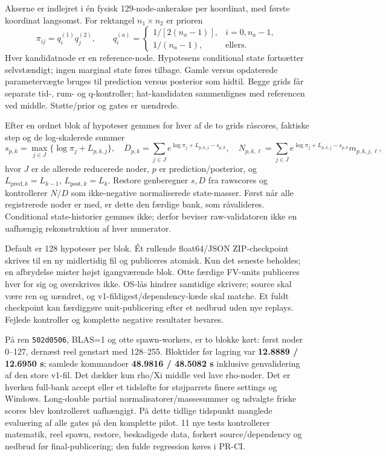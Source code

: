 Akserne er indlejret i én fysisk 129-node-ankerakse per koordinat, med
første koordinat langsomst. For rektangel $n_1\times n_2$ er prioren
\[
 \pi_{ij}=q^{(1)}_i q^{(2)}_j,\qquad
 q^{(a)}_i=\begin{cases}1/[2(n_a-1)],&i=0,n_a-1,\\
 1/(n_a-1),&\text{ellers}.\end{cases}
\]
Hver kandidatnode er en reference-node. Hypotesens conditional state
fortsætter selvstændigt; ingen marginal state føres tilbage. Gamle versus
opdaterede parametervægte bruges til prediction versus posterior som hidtil.
Begge grids får separate tid-, rum- og q-kontroller; hat-kandidaten
sammenlignes med referencen ved middle. Støtte/prior og gates er uændrede.

Efter en ordnet blok af hypoteser gemmes for hver af de to grids råscores,
faktiske step og de log-skalerede summer
\[
 s_{p,k}=\max_{j\in J}\{\log\pi_j+L_{p,k,j}\},\quad
 D_{p,k}=\sum_{j\in J}e^{\log\pi_j+L_{p,k,j}-s_{p,k}},\quad
 N_{p,k,\ell}=\sum_{j\in J}e^{\log\pi_j+L_{p,k,j}-s_{p,k}}m_{p,k,j,\ell},
\]
hvor $J$ er de allerede reducerede noder, $p$ er prediction/posterior,
og $L_{\mathrm{pred},k}=L_{k-1}$, $L_{\mathrm{post},k}=L_k$.
Restore genberegner $s,D$ fra rawscores og kontrollerer
$N/D$ som ikke-negative normaliserede state-masser. Først når alle
registrerede noder er med, er dette den færdige bank, som råvalideres.
Conditional state-historier gemmes ikke; derfor beviser raw-validatoren
ikke en uafhængig rekonstruktion af hver numerator.

Default er 128 hypoteser per blok. Ét rullende float64/JSON ZIP-checkpoint
skrives til en ny midlertidig fil og publiceres atomisk. Kun det seneste
beholdes; en afbrydelse mister højst igangværende blok. Otte færdige FV-units
publiceres hver for sig og overskrives ikke. OS-lås hindrer samtidige skrivere;
source skal være ren og uændret, og v1-fildigest/dependency-kæde skal matche.
Et fuldt checkpoint kan færdiggøre unit-publicering efter et nedbrud uden
nye replays. Fejlede kontroller og komplette negative resultater bevares.

På ren \texttt{502d0506}, BLAS=1 og otte spawn-workers, er to blokke kørt:
først noder 0--127, dernæst reel genstart med 128--255. Bloktider før lagring
var \textbf{12.8889 / 12.6950 s}; samlede kommandoer
\textbf{48.9816 / 48.5082 s} inklusive genvalidering af den store v1-fil.
Det dækker kun rho/Xi middle ved lave rho-noder. Det er hverken full-bank
accept eller et tidsløfte for støjparrets finere settings og Windows.
Long-double partial normalisatorer/massesummer og udvalgte friske scores
blev kontrolleret uafhængigt. På dette tidlige tidspunkt manglede evaluering
af alle gates på den komplette pilot. 11 nye tests kontrollerer matematik, reel spawn,
restore, beskadigede data, forkert source/dependency og nedbrud før
final-publicering; den fulde regression køres i PR-CI.

